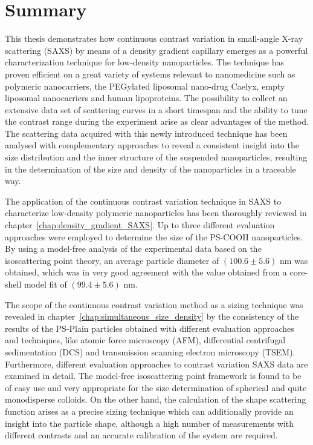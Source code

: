 \chapter{Summary} 
\label{chap:conclusions}
This thesis demonstrates how continuous contrast variation in small-angle X-ray scattering (SAXS) by means of a density gradient capillary emerges as a powerful characterization technique for low-density nanoparticles. The technique has proven efficient on a great variety of systems relevant to nanomedicine such as polymeric nanocarriers, the PEGylated liposomal nano-drug Caelyx, empty liposomal nanocarriers and human lipoproteins. The possibility to collect an extensive data set of scattering curves in a short timespan and the ability to tune the contrast range during the experiment arise as clear advantages of the method. The scattering data acquired with this newly introduced technique has been analysed with complementary approaches to reveal a consistent insight into the size distribution and the inner structure of the suspended nanoparticles, resulting in the determination of the size and density of the nanoparticles in a traceable way. 

The application of the continuous contrast variation technique in SAXS to characterize low-density polymeric nanoparticles has been thoroughly reviewed in chapter~\ref{chap:density_gradient_SAXS}. Up to three different evaluation approaches were employed to determine the size of the PS-COOH nanoparticles. By using a model-free analysis of the experimental data based on the isoscattering point theory, an average particle diameter of $\left( 100.6 \pm 5.6 \right)$ nm was obtained, which was in very good agreement with the value obtained from a core-shell model fit of $\left( 99.4 \pm 5.6  \right)$ nm. 

The scope of the continuous contrast variation method as a sizing technique was revealed in chapter~\ref{chap:simultaneous_size_density} by the consistency of the results of the PS-Plain particles obtained with different evaluation approaches and techniques, like atomic force microscopy (AFM), differential centrifugal sedimentation (DCS) and transmission scanning electron microscopy (TSEM). Furthermore, different evaluation approaches to contrast variation SAXS data are examined in detail. The model-free isoscattering point framework is found to be of easy use and very appropriate for the size determination of spherical and quite monodisperse colloids. On the other hand, the calculation of the shape scattering function arises as a precise sizing technique which can additionally provide an insight into the particle shape, although a high number of measurements with different contrasts and an accurate calibration of the system are required.

